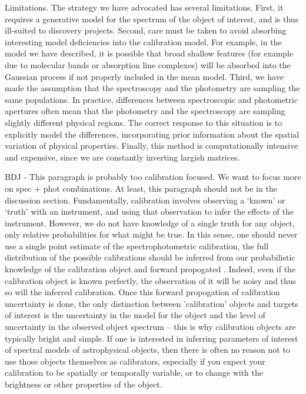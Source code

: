 \documentclass[iop,numberedappendix]{emulateapj}
\begin{document}
Limitations.  The strategy we have advocated has several limitations.
First, it requires a generative model for the spectrum of the object
of interest, and is thus ill-suited to discovery projects.  Second,
care must be taken to avoid absorbing interesting model deficiencies
into the calibration model. For example, in the model we have
described, it is possible that broad shallow features (for example due
to molecular bands or absorption line complexes) will be absorbed into
the Gaussian process if not properly included in the mean
model. Third, we have made the assumption that the spectroscopy and
the photometry are sampling the same populations.  In practice,
differences between spectroscopic and photometric apertures often mean
that the photometry and the spectroscopy are sampling slightly
different physical regions.  The correct response to this situation is
to explicitly model the differences, incorporating prior information
about the spatial variation of physical properties.  Finally, this
method is computationally intensive and expensive, since we are
constantly inverting largish matrices.

{\color{blue} BDJ - This paragraph is probably too calibration
focused. We want to focus more on spec + phot combinations.  At least,
this paragraph should not be in the discussion section.}
Fundamentally, calibration involves observing a `known' or `truth'
with an instrument, and using that observation to infer the effects of
the instrument.  However, we do not have knowledge of a single truth
for any object, only relative probabilities for what might be true.
In this sense, one should never use a single point estimate of the
spectrophotometric calibration, the full distribution of the possible
calibrations should be inferred from our probabilistic knowledge of
the calibration object and forward propogated
\citep[e.g.][]{lee11}. Indeed, even if the calibration object is known
perfectly, the observation of it will be noisy and thus so will the
inferred calibration. Once this forward propogation of calibration
uncertainty is done, the only distinction between 'calibration'
objects and targets of interest is the uncertainty in the model for
the object and the level of uncertainty in the observed object
spectrum -- this is why calibration objects are typically bright and
simple.  If one is interested in inferring parameters of interest of
spectral models of astrophysical objects, then there is often no
reason not to use those objects themselves as calibrators,
especially if you expect your calibration to be spatially or 
temporally variable, or to change with the brightness or other
properties of the object.
\end{document}
